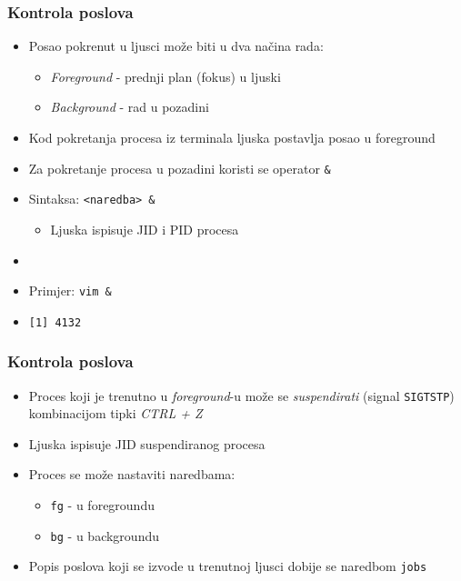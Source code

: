 \documentclass[table,usenames,dvipsnames]{beamer}
\newcommand{\shell}[1]{\texttt{#1}}
\begin{document}
\begin{frame}[t]
	\frametitle{Kontrola poslova}
	\begin{itemize}
		\item Posao pokrenut u ljusci može biti u dva načina rada:
		\begin{itemize}
			\item \emph{Foreground} - prednji plan (fokus) u ljuski
			\item \emph{Background} - rad u pozadini
		\end{itemize}
	    \item Kod pokretanja procesa iz terminala ljuska postavlja posao u foreground
	    \item Za pokretanje procesa u pozadini koristi se operator \shell{\&}
	    \item[] Sintaksa: \shell{<naredba> \&}
	    \begin{itemize}
		    \item Ljuska ispisuje JID i PID procesa
	    \end{itemize}
	    \item[]
	    \item[] Primjer: \shell{vim \&}
	    \item[] \hspace{35pt} \shell{[1] 4132}
	\end{itemize}
\end{frame}

\begin{frame}[t]
	\frametitle{Kontrola poslova}
	\begin{itemize}
		\item Proces koji je trenutno u \emph{foreground}-u može se \emph{suspendirati} (signal \shell{SIGTSTP}) kombinacijom tipki \emph{CTRL + Z}
		\item Ljuska ispisuje JID suspendiranog procesa
		\item Proces se može nastaviti naredbama:
		\begin{itemize}
			\item \shell{fg} - u foregroundu
			\item \shell{bg} - u backgroundu
		\end{itemize}
		\item Popis poslova koji se izvode u trenutnoj ljusci dobije se naredbom \shell{jobs}
	\end{itemize}
\end{frame}
\end{document}
